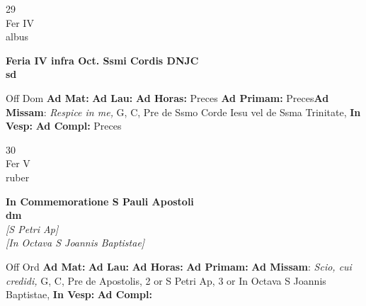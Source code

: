 \documentclass[10pt, openany]{book}
\begin{document}
    \begin{center}
        \begin{minipage}{3.5in}
            \vspace{2em}
            \begin{minipage}{0.5in}
                {\Huge 29} \\
                {\normalsize Fer IV} \\
                {\normalsize albus}
            \end{minipage}
            \begin{minipage}{3.0in}
                \textbf{ \large Feria IV infra Oct. Ssmi Cordis DNJC \\
                \textnormal{\normalsize sd}} \\ 
            \end{minipage}
            \begin{justify}Off Dom
                \textbf{Ad Mat: }
                \textbf{Ad Lau: }
                \textbf{Ad Horas: }Preces
                \textbf{Ad Primam: }Preces\textbf{Ad Missam}: \textit{Respice in me,} G, C, Pre de Ssmo Corde Iesu vel de Ssma Trinitate,  
                \textbf{In Vesp: }
                \textbf{Ad Compl: }Preces
            \end{justify}
        \end{minipage}
    \end{center}

    \begin{center}
        \begin{minipage}{3.5in}
            \vspace{2em}
            \begin{minipage}{0.5in}
                {\Huge 30} \\
                {\normalsize Fer V} \\
                {\normalsize ruber}
            \end{minipage}
            \begin{minipage}{3.0in}
                \textbf{ \large In Commemoratione S Pauli Apostoli \\
                \textnormal{\normalsize dm}} \\ \textit{[S Petri Ap]} \\ \textit{[In Octava S Joannis Baptistae]} \\ 
            \end{minipage}
            \begin{justify}Off Ord
                \textbf{Ad Mat: }
                \textbf{Ad Lau: }
                \textbf{Ad Horas: }
                \textbf{Ad Primam: }\textbf{Ad Missam}: \textit{Scio, cui credidi,} G, C, Pre de Apostolis, 2 or S Petri Ap, 3 or In Octava S Joannis Baptistae,  
                \textbf{In Vesp: }
                \textbf{Ad Compl: }
            \end{justify}
        \end{minipage}
    \end{center}
\end{document}
